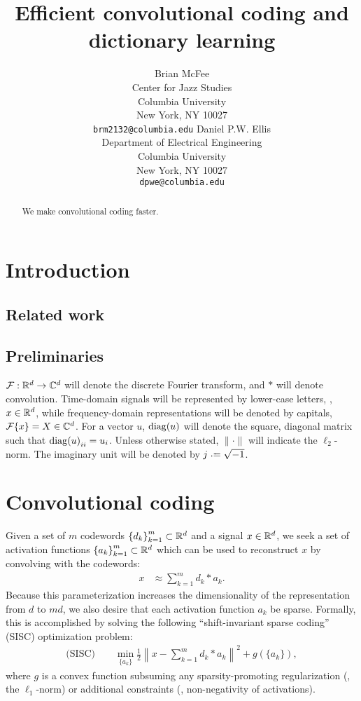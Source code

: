 \documentclass{article} %
\title{Efficient convolutional coding and dictionary learning}
\author{
Brian McFee\\
Center for Jazz Studies\\
Columbia University\\
New York, NY 10027 \\
\texttt{brm2132@columbia.edu}
\And
Daniel P.W. Ellis\\
Department of Electrical Engineering\\
Columbia University\\
New York, NY 10027\\
\texttt{dpwe@columbia.edu}
}
\begin{document}
\maketitle

\begin{abstract}
We make convolutional coding faster.
\end{abstract}

\section{Introduction}
\cite{mairal2010}


\subsection{Related work}
\cite{grosse2007}

\subsection{Preliminaries}
$\mathcal{F}:\mathbb{R}^d\rightarrow\mathbb{C}^d$ will denote the discrete Fourier transform, and $*$ will denote
convolution.
Time-domain signals will be represented by lower-case letters, \eg, $x \in \mathbb{R}^d$, while
frequency-domain representations will be denoted by capitals, $\mathcal{F}\{x\} = X \in \mathbb{C}^d$.
For a vector $u$, $\operatorname{diag}(u)$ will denote the square, diagonal matrix such that 
${\operatorname{diag}(u)}_{ii} = u_i$.  Unless otherwise stated, $\|\cdot\|$ will indicate the
$\ell_2$-norm.  The imaginary unit will be denoted by $j \defeq \sqrt{-1}$.

\section{Convolutional coding}
\label{sec:convcode}
Given a set of $m$ codewords ${\{d_k\}}_{k=1}^m \subset \mathbb{R}^d$ and a signal $x\in\mathbb{R}^d$, 
we seek a set of activation functions ${\{a_k\}}_{k=1}^m\subset\mathbb{R}^d$ which
can be used to reconstruct $x$ by convolving with the codewords:
\begin{align}
x &\approx \sum_{k=1}^m d_k * a_k.\label{eq:convapprox}
\end{align}
Because this parameterization increases the dimensionality of the representation from $d$ 
to $md$, we also desire that each activation function $a_k$ be sparse.  
Formally, this is accomplished by solving the following ``shift-invariant sparse
coding'' (SISC) optimization problem:
\begin{align}
\text{(SISC)}\quad\quad \min_{\{a_k\}} \frac{1}{2} \left\|x - \sum_{k=1}^m d_k * a_k\right\|^2 +
g(\{a_k\}), \label{eq:sisc}
\end{align}
where $g$ is a convex function subsuming any sparsity-promoting regularization 
(\eg, the $\ell_1$-norm) or additional constraints (\eg, non-negativity of activations).
\end{document}

